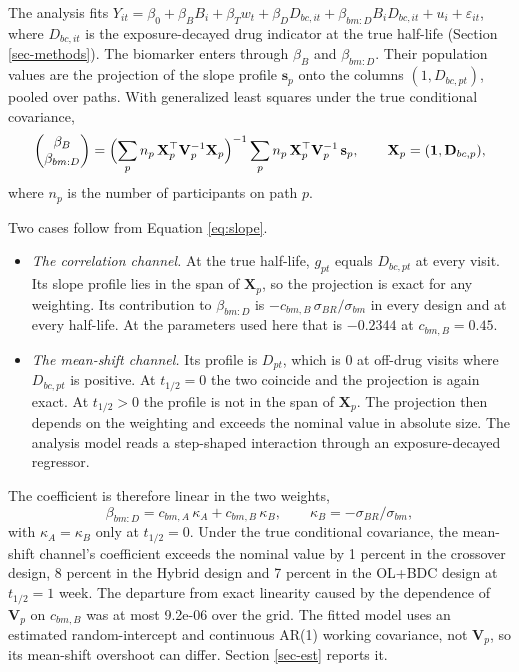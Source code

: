 \documentclass[
  11pt,
]{article}
\providecommand{\tightlist}{%
  \setlength{\itemsep}{0pt}\setlength{\parskip}{0pt}}
\begin{document}
The analysis fits \(Y_{it} = \beta_0 + \beta_B B_i + \beta_T w_t +
\beta_D D_{bc,it} + \beta_{bm:D} B_i D_{bc,it} + u_i +
\varepsilon_{it}\), where \(D_{bc,it}\) is the exposure-decayed drug
indicator at the true half-life (Section \ref{sec-methods}). The
biomarker enters through \(\beta_B\) and \(\beta_{bm:D}\). Their
population values are the projection of the slope profile
\(\mathbf{s}_p\) onto the columns \((1, D_{bc,pt})\), pooled over paths.
With generalized least squares under the true conditional covariance,
\begin{equation}
\begin{pmatrix} \beta_B \\ \beta_{bm:D} \end{pmatrix}
= \Bigl(\sum_p n_p\, \mathbf{X}_p^\top \mathbf{V}_p^{-1}
  \mathbf{X}_p\Bigr)^{-1}
  \sum_p n_p\, \mathbf{X}_p^\top \mathbf{V}_p^{-1}\, \mathbf{s}_p,
\qquad \mathbf{X}_p = (\mathbf{1}, \mathbf{D}_{bc,p}),
\label{eq:proj}
\end{equation}
where \(n_p\) is the number of participants on path \(p\).

Two cases follow from Equation \eqref{eq:slope}.

\begin{itemize}
\tightlist
\item
  \emph{The correlation channel.} At the true half-life, \(g_{pt}\) equals
  \(D_{bc,pt}\) at every visit. Its slope profile lies in the span of
  \(\mathbf{X}_p\), so the projection is exact for any weighting. Its
  contribution to \(\beta_{bm:D}\) is \(-c_{bm,B}\,\sigma_{BR}/\sigma_{bm}\)
  in every design and at every half-life. At the parameters used
  here that is \(-0.2344\) at \(c_{bm,B} = 0.45\).
\item
  \emph{The mean-shift channel.} Its profile is \(D_{pt}\), which is 0 at
  off-drug visits where \(D_{bc,pt}\) is positive. At \(t_{1/2} = 0\) the
  two coincide and the projection is again exact. At \(t_{1/2} > 0\) the
  profile is not in the span of \(\mathbf{X}_p\). The projection then
  depends on the weighting and exceeds the nominal value in absolute
  size. The analysis model reads a step-shaped interaction through an
  exposure-decayed regressor.
\end{itemize}

The coefficient is therefore linear in the two weights,
\begin{equation}
\beta_{bm:D} = c_{bm,A}\,\kappa_A + c_{bm,B}\,\kappa_B,
\qquad \kappa_B = -\sigma_{BR}/\sigma_{bm},
\label{eq:kappa}
\end{equation}
with \(\kappa_A = \kappa_B\) only at \(t_{1/2} = 0\). Under the true
conditional covariance, the mean-shift channel's coefficient exceeds
the nominal value by
1 percent in the crossover design,
8 percent in the Hybrid design and
7 percent in the OL+BDC design at
\(t_{1/2} = 1\) week. The departure from exact linearity caused by the
dependence of \(\mathbf{V}_p\) on \(c_{bm,B}\) was at most
9.2e-06 over the grid.
The fitted model uses an estimated random-intercept and continuous
AR(1) working covariance, not \(\mathbf{V}_p\), so its mean-shift
overshoot can differ. Section \ref{sec-est} reports it.
\end{document}
